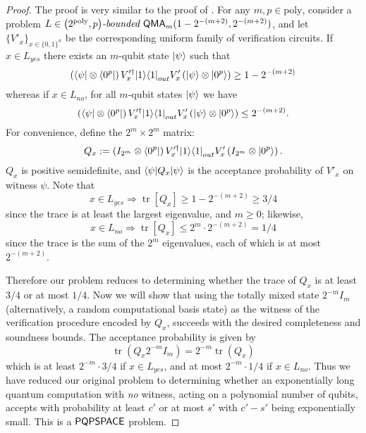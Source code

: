 \documentclass[11pt]{article}
\theoremstyle{definition}
\theoremstyle{remark}
\newcommand\QMA{{\sf{QMA}}}
\newcommand\bddQMA[5]{{\left(#1,#2\right)}\textit{-bounded }\QMA_{#3}(#4,#5)}
\newcommand\PQPSPACE{{\sf{PQPSPACE}}}
\DeclareMathOperator{\tr}{tr}
\newcommand{\poly}{\mathrm{poly}}
\begin{document}
\begin{proof}
The proof is very similar to the proof of \cite[Theorem 3.6]{mw05}. For any $m, p \in\poly$, consider a problem $L\in\bddQMA{2^{\poly}}{p}{m}{1-2^{-(m+2)}}{2^{-(m+2)}}$, and let $\{V'_x\}_{x\in\{0,1\}^n}$ be the corresponding uniform family of verification circuits.
If $x\in L_{yes}$ there exists an $m$-qubit state ${\left\vert{\psi}\right\rangle}$ such that
\begin{equation}
\left({\left\langle{\psi}\right\vert}\otimes {\left\langle{0^p}\right\vert}\right) V'^\dagger_x {\left\vert{1}\right\rangle}{\left\langle{1}\right\vert}_{out} V'_x \left({\left\vert{\psi}\right\rangle}\otimes {\left\vert{0^p}\right\rangle}\right) \ge 1-2^{-(m+2)}
\end{equation}
whereas if $x \in L_{no}$, for all $m$-qubit states ${\left\vert{\psi}\right\rangle}$ we have
\begin{equation}
\left({\left\langle{\psi}\right\vert}\otimes {\left\langle{0^p}\right\vert}\right) V'^\dagger_x {\left\vert{1}\right\rangle}{\left\langle{1}\right\vert}_{out} V'_x \left({\left\vert{\psi}\right\rangle}\otimes {\left\vert{0^p}\right\rangle}\right) \le 2^{-(m+2)}.
\end{equation}
For convenience, define the $2^m \times 2^m$ matrix:
\begin{equation}
Q_x := \left(I_{2^m}\otimes {\left\langle{0^p}\right\vert}\right) V'^\dagger_x {\left\vert{1}\right\rangle}{\left\langle{1}\right\vert}_{out} V'_x \left(I_{2^m}\otimes {\left\vert{0^p}\right\rangle}\right).
\end{equation}
$Q_x$ is positive semidefinite, and ${\left\langle{\psi}\right\vert}Q_x{\left\vert{\psi}\right\rangle}$ is the acceptance probability of $V'_x$ on witness $\psi$.
Note that
\begin{equation}
x\in L_{yes} \Rightarrow \tr[Q_x]\ge 1 - 2^{-(m+2)} \ge 3/4
\end{equation}
since the trace is at least the largest eigenvalue, and $m\geq 0$; likewise,
\begin{equation}
x\in L_{no} \Rightarrow \tr[Q_x]\le 2^m \cdot 2^{-(m+2)} = 1/4
\end{equation}
since the trace is the sum of the $2^m$ eigenvalues, each of which is at most $2^{-(m+2)}$. 

Therefore our problem reduces to determining whether the trace of $Q_x$ is at least $3/4$ or at most $1/4$.  Now we will show that using the totally mixed state $2^{-m}I_m$ (alternatively, a random computational basis state) as the witness of the verification procedure encoded by $Q_x$, succeeds with the desired completeness and soundness bounds.  The acceptance probability is given by
\begin{equation}
\tr(Q_x 2^{-m}I_m) = 2^{-m} \tr(Q_x)
\end{equation}
which is at least $2^{-m} \cdot 3/4$ if $x\in L_{yes}$, and at most $2^{-m} \cdot 1/4$ if $x\in L_{no}$. Thus we have reduced our original problem to determining whether an exponentially long quantum computation with \emph{no} witness, acting on a polynomial number of qubits, accepts with probability at least $c'$ or at most $s'$ with $c' - s'$ being exponentially small. This is a $\PQPSPACE$ problem.

\end{proof}
\end{document}

